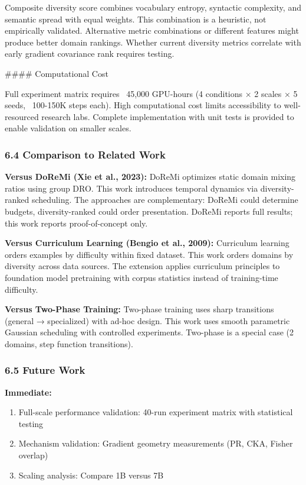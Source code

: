 Composite diversity score combines vocabulary entropy, syntactic complexity, and semantic spread with equal weights. This combination is a heuristic, not empirically validated. Alternative metric combinations or different features might produce better domain rankings. Whether current diversity metrics correlate with early gradient covariance rank requires testing.

\#\#\#\# Computational Cost

Full experiment matrix requires ~45,000 GPU-hours (4 conditions × 2 scales × 5 seeds, ~100-150K steps each). High computational cost limits accessibility to well-resourced research labs. Complete implementation with unit tests is provided to enable validation on smaller scales.

\subsubsection{6.4 Comparison to Related Work}

\textbf{Versus DoReMi (Xie et al., 2023):}
DoReMi optimizes static domain mixing ratios using group DRO. This work introduces temporal dynamics via diversity-ranked scheduling. The approaches are complementary: DoReMi could determine budgets, diversity-ranked could order presentation. DoReMi reports full results; this work reports proof-of-concept only.

\textbf{Versus Curriculum Learning (Bengio et al., 2009):}
Curriculum learning orders examples by difficulty within fixed dataset. This work orders domains by diversity across data sources. The extension applies curriculum principles to foundation model pretraining with corpus statistics instead of training-time difficulty.

\textbf{Versus Two-Phase Training:}
Two-phase training uses sharp transitions (general → specialized) with ad-hoc design. This work uses smooth parametric Gaussian scheduling with controlled experiments. Two-phase is a special case (2 domains, step function transitions).

\subsubsection{6.5 Future Work}

\textbf{Immediate:}
\begin{enumerate}
\item Full-scale performance validation: 40-run experiment matrix with statistical testing
\item Mechanism validation: Gradient geometry measurements (PR, CKA, Fisher overlap)
\item Scaling analysis: Compare 1B versus 7B
\end{enumerate}


